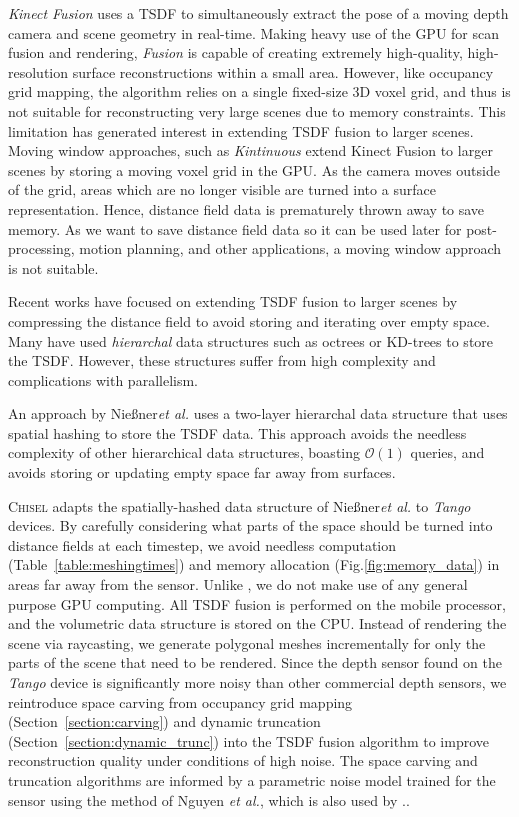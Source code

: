 \documentclass[conference]{IEEEtran}
\newcommand{\sref}[1]{Section~\ref{#1}}
\newcommand{\figref}[1]{Fig.\ref{#1}}
\newcommand{\tabref}[1]{Table~\ref{#1}}
\newcommand{\etal}{\textit{et al.}\xspace}
\newcommand{\Tango}{\textit{Tango}\xspace}
\newcommand{\TSDF}{TSDF\xspace}
\newcommand{\Niessner}{Nie{\ss}ner\xspace}
\newcommand{\chisel}{\textsc{Chisel}\xspace}
\begin{document}
\emph{Kinect Fusion} \cite{Newcombe} uses a \TSDF to simultaneously extract the
pose of a moving depth camera and scene geometry in real-time. Making
heavy use of the GPU for scan fusion and rendering, \textit{Fusion} is capable
of creating extremely high-quality, high-resolution surface reconstructions within
a small area. However, like occupancy grid mapping, the algorithm relies on a
single fixed-size 3D voxel grid, and thus is not suitable for reconstructing
very large scenes due to memory constraints. This limitation has generated
interest in extending  \TSDF fusion to larger scenes. 
Moving window approaches, such as \emph{Kintinuous} \cite{Whelan2013} extend
Kinect Fusion to larger scenes by storing  a moving voxel grid in the GPU. As
the camera moves outside of the grid, areas which are no longer visible are
turned into a surface representation. Hence, distance field data is prematurely 
thrown away to save memory. As we want to save distance field data so it can be
used later for post-processing, motion planning, and other applications, a
moving window approach is not suitable.

Recent works have focused on extending \TSDF fusion to larger scenes by
compressing the distance field to avoid storing and iterating
over empty space. Many have used \textit{hierarchal} data structures such as
octrees or KD-trees to store the \TSDF \cite{Zeng2012, Chen2012}. However, these
structures suffer from high complexity and complications with parallelism. 

An approach by \Niessner \etal \cite{NiessnerHashing} uses a two-layer
hierarchal data structure that uses spatial hashing \cite{SpatialHashing} to
store the \TSDF data. This approach avoids the needless complexity of other
hierarchical data structures, boasting $\mathcal{O}(1)$ queries, and avoids
storing or updating empty space far away from surfaces.

\chisel adapts the spatially-hashed data structure of
\Niessner \etal \cite{NiessnerHashing} to \Tango devices. By carefully
considering what parts of the space should be turned into distance fields at
each timestep, we avoid needless computation (\tabref{table:meshingtimes}) and
memory allocation (\figref{fig:memory_data}) in areas far away from the sensor.
Unlike \cite{NiessnerHashing}, we do not make use of any general purpose GPU
computing. All \TSDF fusion is performed on the mobile processor, and the
volumetric data structure is stored on the CPU. Instead of rendering the scene
via raycasting, we generate polygonal meshes incrementally for only the parts
of the scene that need to be rendered. Since the depth sensor found on the
\Tango device is significantly more noisy than other commercial depth
sensors, we reintroduce space carving \cite{Elfes1989} from occupancy grid
mapping (\sref{section:carving}) and dynamic truncation
(\sref{section:dynamic_trunc}) into the \TSDF fusion algorithm to improve
reconstruction quality under conditions of high noise. The space carving and
truncation algorithms are informed by a parametric noise model trained for the
sensor using the method of Nguyen \etal \cite{Nguyen2012}, which is also used
by \cite{NiessnerHashing}..
\end{document}
